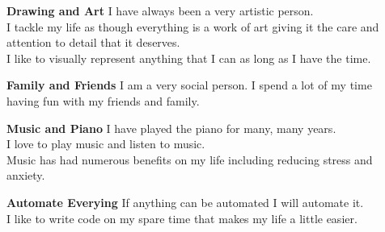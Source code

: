 
\begin{cvparagraph}

\begin{description}
  \item[] \textbf{Drawing and Art} \newline
  I have always been a very artistic person. \\
  I tackle my life as though everything is a work of art giving it the care and attention to detail that it deserves. \\
  I like to visually represent anything that I can as long as I have the time.
  \item[] \textbf{Family and Friends} \newline
  I am a very social person.  I spend a lot of my time having fun with my friends and family.
  \item[] \textbf{Music and Piano} \newline
  I have played the piano for many, many years. \\
  I love to play music and listen to music. \\
  Music has had numerous benefits on my life including reducing stress and anxiety.
  \item[] \textbf{Automate Everying} \newline
  If anything can be automated I will automate it. \\
  I like to write code on my spare time that makes my life a little easier.
\end{description}
\end{cvparagraph}

